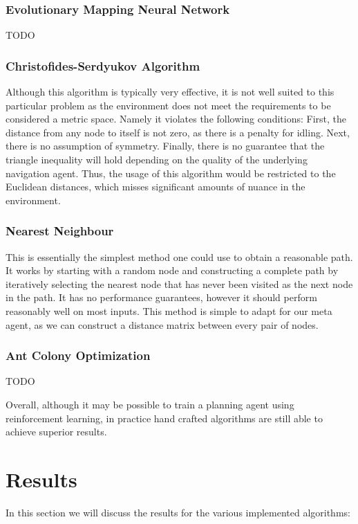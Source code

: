 \documentclass{article}
\begin{document}
\subsubsection{Evolutionary Mapping Neural Network}
TODO

\subsubsection{Christofides-Serdyukov Algorithm}
Although this algorithm is typically very effective, it is not well suited to this particular problem as the environment does not meet the requirements to be considered a metric space. Namely it violates the following conditions: First, the distance from any node to itself is not zero, as there is a penalty for idling. Next, there is no assumption of symmetry. Finally, there is no guarantee that the triangle inequality will hold depending on the quality of the underlying navigation agent. Thus, the usage of this algorithm would be restricted to the Euclidean distances, which misses significant amounts of nuance in the environment.

\subsubsection{Nearest Neighbour}
This is essentially the simplest method one could use to obtain a reasonable path. It works by starting with a random node and constructing a complete path by iteratively selecting the nearest node that has never been visited as the next node in the path. It has no performance guarantees, however it should perform reasonably well on most inputs. This method is simple to adapt for our meta agent, as we can construct a distance matrix between every pair of nodes.

\subsubsection{Ant Colony Optimization}
TODO

Overall, although it may be possible to train a planning agent using reinforcement learning, in practice hand crafted algorithms are still able to achieve superior results.

\section{Results}
\label{results}
In this section we will discuss the results for the various implemented algorithms:
\end{document}

